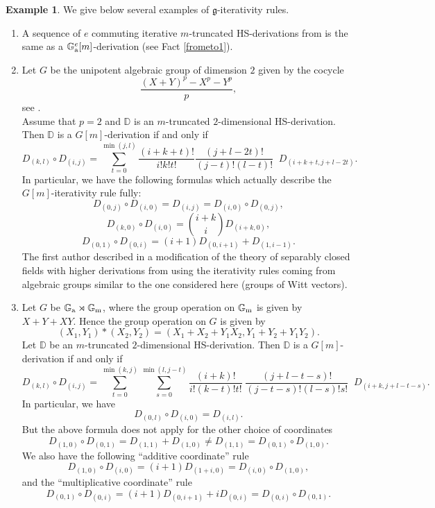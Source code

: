\documentclass[10pt]{amsart}
\theoremstyle{definition}
\newtheorem{example}[theorem]{Example}
\begin{document}
\begin{example}\label{gitex}
We give below several examples of $\mathfrak{g}$-iterativity rules.
\begin{enumerate}
\item A sequence of $e$ commuting iterative $m$-truncated HS-derivations from \cite{K3} is the same as a $\mathbb{G}_{\rm{a}}^e[m]$-derivation (see Fact \ref{frometo1}).

\item Let $G$ be the unipotent algebraic group of dimension $2$ given by the cocycle
$$\frac{(X+Y)^p-X^p-Y^p}{p},$$
see \cite[p. 171]{serre1988algebraic}.
\\
Assume that $p=2$ and $\mathbb{D}$ is an $m$-truncated $2$-dimensional HS-derivation. Then $\mathbb{D}$ is a $G[m]$-derivation if and only if
$$D_{(k,l)}\circ D_{(i,j)}=\sum\limits_{t=0}^{\min(j,l)}\frac{(i+k+t)!}{i!k!t!}
\frac{(j+l-2t)!}{(j-t)!(l-t)!}\;\; D_{(i+k+t,j+l-2t)}.$$
In particular, we have the following formulas which actually describe the $G[m]$-iterativity rule fully:
$$D_{(0,j)}\circ D_{(i,0)}=D_{(i,j)}=D_{(i,0)}\circ D_{(0,j)},$$
$$D_{(k,0)}\circ D_{(i,0)}={i+k\choose i}D_{(i+k,0)},$$
$$D_{(0,1)}\circ D_{(0,i)}=(i+1)D_{(0,i+1)}+D_{(1,i-1)}.$$
The first author described in \cite{Hoff2} a modification of the theory of separably closed fields with higher derivations from \cite{MeWo} using the iterativity rules coming from algebraic groups similar to the one considered here (groups of Witt vectors).

\item Let $G$ be $\mathbb{G}_{\rm{a}}\rtimes \mathbb{G}_{\rm{m}}$, where the group operation on $\mathbb{G}_{\rm{m}}$ is given by $X+Y+XY$. Hence the group operation on $G$ is given by
$$(X_1,Y_1)*(X_2,Y_2)=(X_1+X_2+Y_1X_2,Y_1+Y_2+Y_1Y_2).$$
Let $\mathbb{D}$ be an $m$-truncated $2$-dimensional HS-derivation. Then $\mathbb{D}$ is a $G[m]$-derivation if and only if
$$D_{(k,l)}\circ D_{(i,j)} = \sum\limits_{t=0}^{\min(k,j)}\sum\limits_{s=0}^{\min(l,j-t)}
\frac{(i+k)!}{i!(k-t)!t!}\;\frac{(j+l-t-s)!}{(j-t-s)!(l-s)!s!}\;\; D_{(i+k,j+l-t-s)}.$$
In particular, we have
$$D_{(0,l)}\circ D_{(i,0)}=D_{(i,l)}.$$
But the above formula does not apply for the other choice of coordinates
$$D_{(1,0)}\circ D_{(0,1)}=D_{(1,1)}+D_{(1,0)}\neq D_{(1,1)}=D_{(0,1)}\circ D_{(1,0)}.$$
We also have the following ``additive coordinate'' rule
$$D_{(1,0)}\circ D_{(i,0)}=(i+1)D_{(1+i,0)}=D_{(i,0)}\circ D_{(1,0)},$$
and the ``multiplicative coordinate'' rule
$$D_{(0,1)}\circ D_{(0,i)}=(i+1)D_{(0,i+1)}+iD_{(0,i)}=D_{(0,i)}\circ D_{(0,1)}.$$
\end{enumerate}
\end{example}
\end{document}
